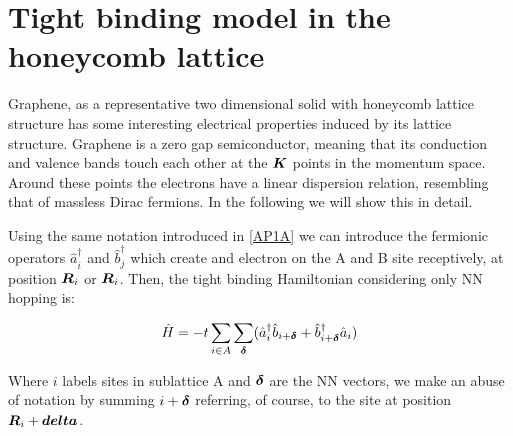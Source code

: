 \chapter{Tight binding model in the honeycomb lattice}
\label{APD}

Graphene, as a representative two dimensional solid with honeycomb lattice structure has some interesting electrical properties induced by its lattice structure. Graphene is a zero gap semiconductor, meaning that its conduction and valence bands touch each other at the $\boldsymbol{K}$ points in the momentum space. Around these points the electrons have a linear dispersion relation, resembling that of massless Dirac fermions. In the following we will show this in detail.

Using the same notation introduced in \ref{AP1A} we can introduce the fermionic operators $\hat{a}^\dagger_i$ and $\hat{b}^\dagger_j$ which create and electron on the A and B site receptively, at position $\boldsymbol{R}_i$ or $\boldsymbol{R}_i$. Then, the tight binding Hamiltonian considering only NN hopping is:

\begin{equation}
\hat{H} = -t\sum_{i \in A}\sum_{\boldsymbol{\delta}} (\hat{a}^\dagger_i\hat{b}_{i+\boldsymbol{\delta}} + \hat{b}^\dagger_{i+\boldsymbol{\delta}}\hat{a}_i)
\end{equation}

Where $i$ labels sites in sublattice A and $\boldsymbol{\delta}$ are the NN vectors, we make an abuse of notation by summing $i+\boldsymbol{\delta}$ referring, of course, to the site at position $\boldsymbol{R}_i+\boldsymbol{delta}$. 
